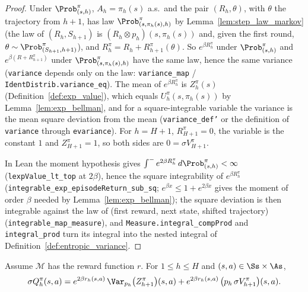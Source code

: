 \begin{proof}
\leanok
Under $\Prob^\pi_{(s,h)}$, $A_h = \pi_h(s)$ a.s.\ and the pair $(R_h, \theta)$, with $\theta$
the trajectory from $h + 1$, has law $\Prob^\pi_{(s, \pi_h(s), h)}$ by
Lemma~\ref{lem:step_law_markov} (the law of $(R_h, S_{h+1})$ is $(R_h \otimes p_h)(s, \pi_h(s))$
and, given the first round, $\theta \sim \Prob^\pi_{(S_{h+1}, h+1)}$), and
$R^\pi_h = R_h + R^\pi_{h+1}(\theta)$. So $e^{\beta R^\pi_h}$ under $\Prob^\pi_{(s,h)}$ and
$e^{\beta(R + R^\pi_{h+1})}$ under $\Prob^\pi_{(s, \pi_h(s), h)}$ have the same law, hence the same
variance (\texttt{variance} depends only on the law: \texttt{variance\_map} /
\texttt{IdentDistrib.variance\_eq}). The mean of $e^{\beta R^\pi_h}$ is $Z^\pi_h(s)$
(Definition~\ref{def:exp_value}), which equals $U^\pi_h(s, \pi_h(s))$ by
Lemma~\ref{lem:exp_bellman}, and for a square-integrable variable the variance is the mean
square deviation from the mean (\texttt{variance\_def'} or the definition of
\texttt{variance} through \texttt{evariance}). For $h = H + 1$, $R^\pi_{H+1} = 0$, the variable
is the constant $1$ and $Z^\pi_{H+1} = 1$, so both sides are $0 = \sigma V^\pi_{H+1}$.

In Lean the moment hypothesis gives $\int^- e^{2\beta R^\pi_h}\,d\Prob^\pi_{(s,h)} < \infty$
(\texttt{lexpValue\_lt\_top} at $2\beta$), hence the square integrability of $e^{\beta R^\pi_h}$
(\texttt{integrable\_exp\_episodeReturn\_sub\_sq}; $e^{\beta x} \le 1 + e^{2\beta x}$ gives the moment
of order $\beta$ needed by Lemma~\ref{lem:exp_bellman}); the square deviation is then integrable
against the law of (first reward, next state, shifted trajectory)
(\texttt{integrable\_map\_measure}), and \texttt{Measure.integral\_compProd} and
\texttt{integral\_prod} turn its integral into the nested integral of
Definition~\ref{def:entropic_variance}.
\end{proof}

\begin{lemma}\label{lem:entropic_variance_recursion}
\leanok
{}
Assume $\mathcal M$ has the reward function $r$. For $1 \le h \le H$ and $(s,a) \in \Ss\times\As$,
\[
  \sigma Q^\pi_h(s, a) = e^{2\beta r_h(s,a)}\,\Var_{p_h}\big(Z^\pi_{h+1}\big)(s,a)
  + e^{2\beta r_h(s,a)}\,\big(p_h\,\sigma V^\pi_{h+1}\big)(s,a) .
\]
\end{lemma}

